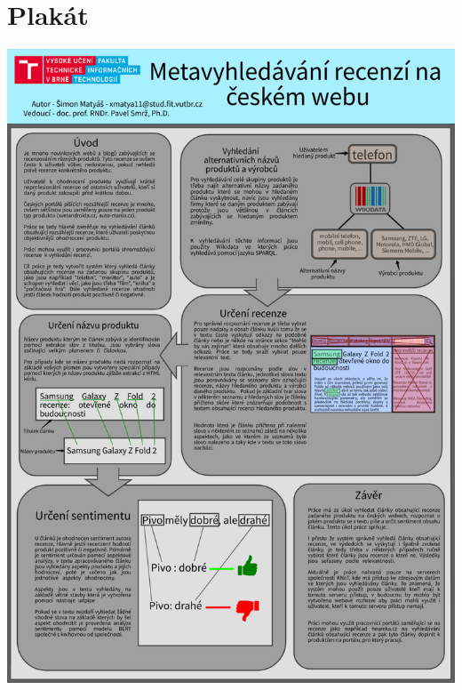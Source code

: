 \chapter{Plakát}
\begin{center}
    \includegraphics[scale=0.28]{obrazky-figures/plakat.pdf}
\end{center}